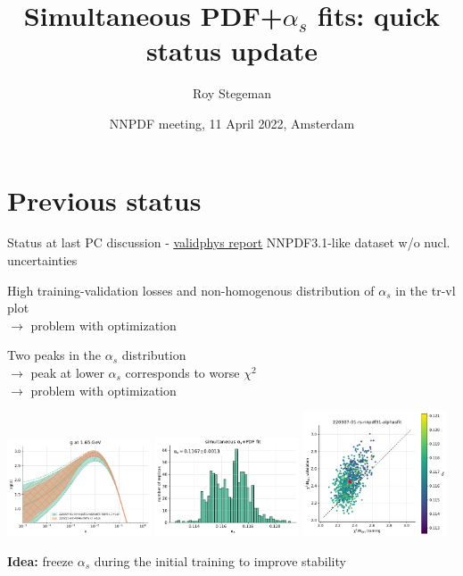 \documentclass[aspectratio=169,10pt]{beamer}
\title{Simultaneous PDF+$\alpha_s$ fits: quick status update}
\date{NNPDF meeting, 11 April 2022, Amsterdam}
\author{Roy Stegeman}
\institute{University of Milan and INFN Milan}
\begin{document}
{
\begin{frame}
  \titlepage
\end{frame}
}




\section*{Previous status}

\begin{frame}[t]{Status at last PC discussion - \underline{\href{https://vp.nnpdf.science/AkI8zEchR4qU5tn7zxUZ0g==/}{validphys report}}}
  NNPDF3.1-like dataset w/o nucl. uncertainties\\\vspace*{0.5em}

  High training-validation losses and non-homogenous distribution of $\alpha_s$ in the tr-vl plot \\
  $\rightarrow$ problem with optimization\\\vspace*{0.5em}

  Two peaks in the $\alpha_s$ distribution \\
  $\rightarrow$ peak at lower $\alpha_s$ corresponds to worse $\chi^2$ \\
  $\rightarrow$ problem with optimization

  \vspace*{-8mm}
  \includegraphics[width=0.32\textwidth]{PDFnormalize0_Basespecs0_PDFscalespecs0_plot_pdfs_g_prev.pdf}
  \includegraphics[width=0.32\textwidth]{alphas_hist_prev.pdf}
  \includegraphics[width=0.32\textwidth]{plot_training_validation_prev.pdf}

  \textbf{Idea:} freeze $\alpha_s$ during the initial training to improve stability

\end{frame}
\end{document}
